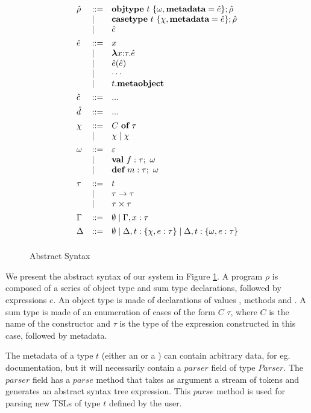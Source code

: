 \begin{figure}[t]
\[\begin{array}[t]{lll}
\hat\rho & \bnfdef & \keyw{objtype}~ t~ \{ \omega, \keyw{metadata}=\hat e \}; \hat\rho \\
     & \bnfalt & \keyw{casetype}~ t~ \{ \chi, \keyw{metadata}=\hat e \}; \hat\rho\\
     & \bnfalt & \hat e
     \\[1ex]
\hat{e}    & \bnfdef & x \\
     & \bnfalt & \boldsymbol\lambda x{:}\tau . \hat{e} \\ %
     & \bnfalt & \hat{e}(\hat{e}) \\
     & \bnfalt & \cdots \\
     & \bnfalt & t.\keyw{metaobject} 
\\[1ex]
\hat c    & \bnfdef & ...
	 \\[1ex]
\hat d   & \bnfdef & ... 
\\[1ex] 
\chi & \bnfdef & C~\keyw{of}~\tau\\
     & \bnfalt & \chi \bnfalt \chi 
\\[1ex]
\omega &\bnfdef & \varepsilon \\  
         & \bnfalt & \keyw{val}~ f:\tau;~\omega\\
         & \bnfalt & \keyw{def}~ m:\tau;~\omega 
\\[1ex]
\tau & \bnfdef & t\\
     & \bnfalt & \tau \rightarrow \tau \\
     & \bnfalt & \tau \times \tau 
\\[1ex]
\Gamma & \bnfdef & \emptyset \bnfalt \Gamma, x:\tau
\\[1ex]
\Delta & \bnfdef & \emptyset \bnfalt \Delta, t:\{\chi, e:\tau\} \bnfalt \Delta, t:\{\omega, e:\tau\}
\\[1ex]

\end{array}
\]
\caption{Abstract Syntax}
\label{fig:core2-syntax}
\end{figure}

We present the abstract syntax of our system in Figure \ref{fig:core2-syntax}. A program $\rho$ is composed of a series of object type  and sum type  declarations, followed by expressions $e$. An object type is made of declarations of values , methods  and . A sum type is made of an enumeration of cases of the form $C$  $\tau$, where $C$ is the name of the constructor and $\tau$ is the type of the expression constructed in this case, followed by metadata.

The metadata of a type $t$ (either an  or a ) can contain arbitrary data, for eg. documentation, but it will necessarily contain a $parser$ field of type $Parser$. The $parser$ field has a $parse$ method that takes as argument a stream of tokens and generates an abstract syntax tree expression. This $parse$ method is used for parsing new TSLs of type $t$ defined by the user. 

